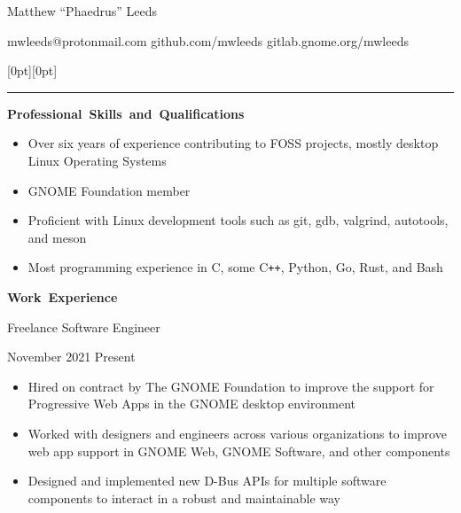 \documentclass[11pt]{article}
\begin{document}
\centerline{\huge Matthew “Phaedrus” Leeds}
\vspace{0.4em}
\centerline{\normalsize mwleeds@protonmail.com \space \textbar \space github.com/mwleeds \space \textbar \space gitlab.gnome.org/mwleeds}

\noindent \begin{minipage}[t]{\textwidth}
\raisebox{9pt}[0pt][0pt]{\rule{\textwidth}{0.2mm}\hspace{-\textwidth}}
\end{minipage}

\vspace{0.8em}
\hbox{\large \textbf{Professional Skills and Qualifications}}

\begin{itemize}
  \item Over six years of experience contributing to FOSS projects, mostly desktop Linux Operating Systems
  \item GNOME Foundation member
  \item Proficient with Linux development tools such as git, gdb, valgrind, autotools, and meson
  \item Most programming experience in C, some C\texttt{++}, Python, Go, Rust, and Bash
\end{itemize}

\vspace{0.8em}
\hbox{\large \textbf{Work Experience}}

\begin{minipage}[t]{0.65\textwidth}
\flushleft
Freelance Software Engineer\\
\end{minipage}
\begin{minipage}[t]{0.30\textwidth}
\flushright
November 2021 \space \textemdash \space Present\\
\end{minipage}

\begin{itemize}
  \item Hired on contract by The GNOME Foundation to improve the support for Progressive Web Apps in the GNOME desktop environment
  \item Worked with designers and engineers across various organizations to improve web app support in GNOME Web, GNOME Software, and other components
  \item Designed and implemented new D-Bus APIs for multiple software components to interact in a robust and maintainable way
\end{itemize}
\end{document}
